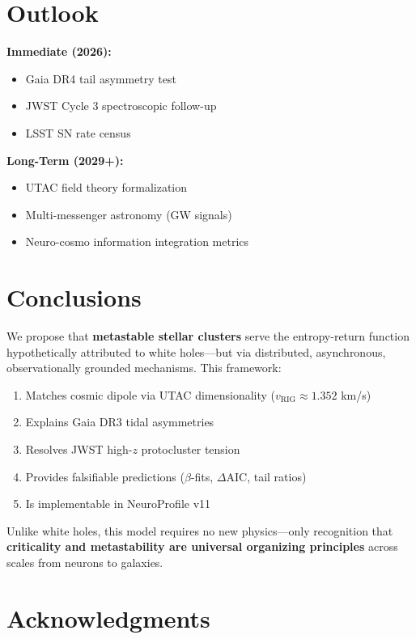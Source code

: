 \documentclass[11pt,a4paper,twocolumn]{article}
\begin{document}
\section{Outlook}

\textbf{Immediate (2026):}
\begin{itemize}
    \item Gaia DR4 tail asymmetry test
    \item JWST Cycle 3 spectroscopic follow-up
    \item LSST SN rate census
\end{itemize}

\textbf{Long-Term (2029+):}
\begin{itemize}
    \item UTAC field theory formalization
    \item Multi-messenger astronomy (GW signals)
    \item Neuro-cosmo information integration metrics
\end{itemize}

\section{Conclusions}

We propose that \textbf{metastable stellar clusters} serve the entropy-return function hypothetically attributed to white holes---but via distributed, asynchronous, observationally grounded mechanisms. This framework:

\begin{enumerate}
    \item Matches cosmic dipole via UTAC dimensionality ($v_{\text{RIG}} \approx 1.352$ km/s)
    \item Explains Gaia DR3 tidal asymmetries
    \item Resolves JWST high-$z$ protocluster tension
    \item Provides falsifiable predictions ($\beta$-fits, $\Delta$AIC, tail ratios)
    \item Is implementable in NeuroProfile v11
\end{enumerate}

Unlike white holes, this model requires no new physics---only recognition that \textbf{criticality and metastability are universal organizing principles} across scales from neurons to galaxies.

\section*{Acknowledgments}
\end{document}
